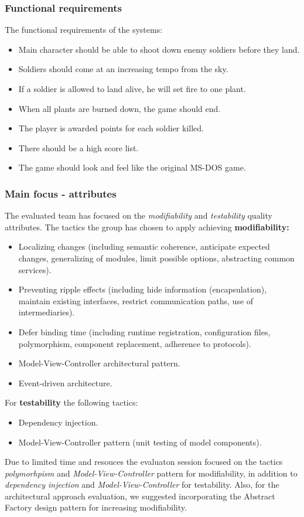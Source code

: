 \subsubsection{Functional requirements}
The functional requirements of the systems:
\begin{itemize}
\item Main character should be able to shoot down enemy soldiers before they land.
\item Soldiers should come at an increasing tempo from the sky.
\item If a soldier is allowed to land alive, he will set fire to one plant.
\item When all plants are burned down, the game should end.
\item The player is awarded points for each soldier killed.
\item There should be a high score list.
\item The game should look and feel like the original MS-DOS game.
\end{itemize}

\subsubsection{Main focus - attributes}

The evaluated team has focused on the \emph{modifiability} and \emph{testability} quality attributes. The tactics the group has chosen to apply achieving  \textbf{modifiability:}
\begin{itemize}
\item Localizing changes (including semantic coherence, anticipate expected changes, generalizing of modules, limit possible options, abstracting common services).
\item Preventing ripple effects (including hide information (encapsulation), maintain existing interfaces, restrict communication paths, use of intermediaries).
\item Defer binding time (including runtime registration, configuration files, polymorphism, component replacement, adherence to protocols).
\item Model-View-Controller architectural pattern.
\item Event-driven architecture.
\end{itemize}

For \textbf{testability} the following tactics:
\begin{itemize}
\item Dependency injection.
\item Model-View-Controller pattern (unit testing of model components).
\end{itemize}

Due to limited time and resouces the evaluaton session focused on the tactics \emph{polymorhpism} and \emph{Model-View-Controller} pattern for modifiability, in addition to \emph{dependency injection} and \emph{Model-View-Controller} for testability. Also, for the architectural approach evaluation, we suggested incorporating the Abstract Factory design pattern for increasing modifiability.


